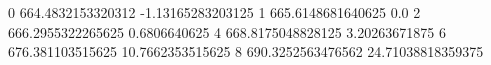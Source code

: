 0 664.4832153320312 -1.13165283203125
1 665.6148681640625 0.0
2 666.2955322265625 0.6806640625
4 668.8175048828125 3.20263671875
6 676.381103515625 10.7662353515625
8 690.3252563476562 24.71038818359375
